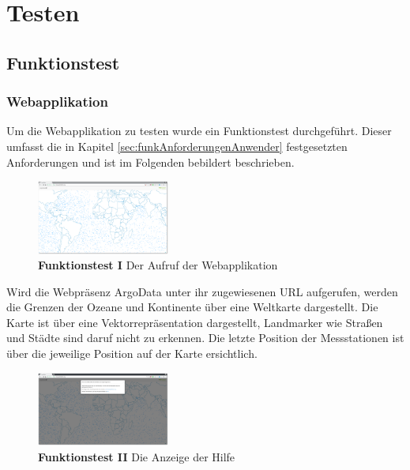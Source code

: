 \section{Testen}

\subsection{Funktionstest}

\subsubsection{Webapplikation}

Um die Webapplikation zu testen wurde ein Funktionstest durchgeführt. Dieser umfasst die in Kapitel \ref{sec:funkAnforderungenAnwender} festgesetzten Anforderungen und ist im Folgenden bebildert beschrieben.\newline





\begin{figure}
 \centering
 \includegraphics[width=0.39\textwidth]{pix/ftest/001.png}

 \caption{\textbf{Funktionstest I} Der Aufruf der Webapplikation}
 \label{fig:ftest001}
\end{figure}  


Wird die Webpräsenz ArgoData unter ihr zugewiesenen URL aufgerufen, werden die Grenzen der Ozeane und Kontinente über eine Weltkarte dargestellt. Die Karte ist über eine Vektorrepräsentation dargestellt, Landmarker wie Straßen und Städte sind daruf nicht zu erkennen. Die letzte Position der Messstationen ist über die jeweilige Position auf der Karte ersichtlich.
\newline\newline\newline


\begin{figure}
 \centering
 \includegraphics[width=0.39\textwidth]{pix/ftest/001b.png}

 \caption{\textbf{Funktionstest II} Die Anzeige der Hilfe}
 \label{fig:ftest001b}
\end{figure} 

